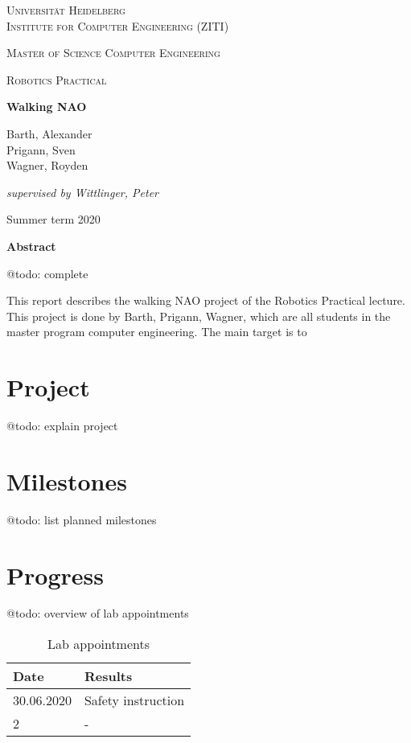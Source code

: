 \documentclass[12pt]{article}
\newcommand{\lecture}{Robotics Practical}
\newcommand{\nao}{NAO} %
\newcommand{\project}{Walking \nao}
\newcommand{\groupmembersshort}{Barth, Prigann, Wagner}
\newcommand{\groupmemberslist}{Barth, Alexander\\Prigann, Sven\\Wagner, Royden}
\newcommand{\semester}{Summer term 2020}
\newcommand{\supervisor}{Wittlinger, Peter}
\begin{document}
	\begin{titlepage}
		\centering
		
		{\scshape\LARGE Universität Heidelberg\\Institute for Computer Engineering (ZITI) \par}
		\vspace{1.5cm}
		{\scshape\Large Master of Science Computer Engineering \par}
		\vspace{0.5cm}
		{\scshape\Large \lecture \par}
		\vspace{1.5cm}
		{\huge\bfseries \project \par}
		\vspace{2cm}
		{\large \groupmemberslist \par}
		\vspace{2cm}
		{\itshape supervised by \supervisor \par}
		\vfill
		
		
		{\large \semester \par}
	\end{titlepage}

\noindent \textbf{Abstract}

@todo: complete

This report describes the walking \nao{} project of the \lecture{} lecture.
This project is done by \groupmembersshort, which are all students in the master program computer engineering.
The main target is to

\tableofcontents
\newpage

\section{Project}

@todo: explain project

\section{Milestones}

@todo: list planned milestones

\section{Progress}

@todo: overview of lab appointments

	\begin{table}[H]
	\centering
	
	\caption{Lab appointments}
	\begin{tabular}{l|l}
		\hline \cellcolor{gray!40}\textbf{Date} & 
		\cellcolor{gray!40}\textbf{Results} \\
		\hline\hline
		30.06.2020 & Safety instruction \\\hline
		2 & -  \\\hline
	\end{tabular}
	\label{tab:test}
\end{table}
\end{document}
